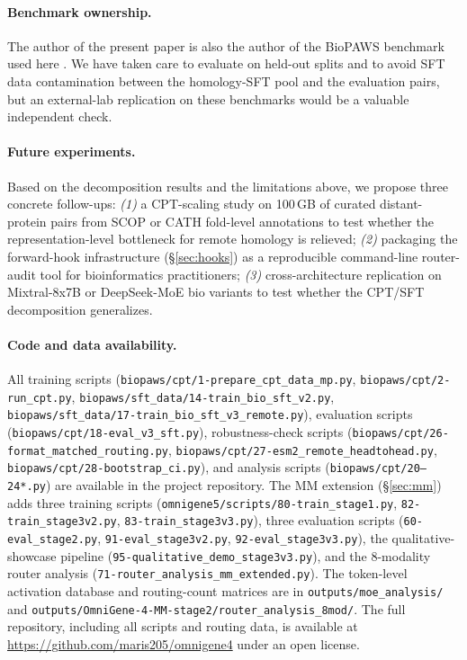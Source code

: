 \documentclass[11pt]{article}
\begin{document}
\paragraph{Benchmark ownership.} The author of the present paper is also the author of the BioPAWS benchmark used here \citep{wang2026biopaws}. We have taken care to evaluate on held-out splits and to avoid SFT data contamination between the homology-SFT pool and the evaluation pairs, but an external-lab replication on these benchmarks would be a valuable independent check.

\paragraph{Future experiments.}

Based on the decomposition results and the limitations above, we propose three concrete follow-ups: \emph{(1)} a CPT-scaling study on 100\,GB of curated distant-protein pairs from SCOP \citep{murzin1995scop} or CATH fold-level annotations to test whether the representation-level bottleneck for remote homology is relieved; \emph{(2)} packaging the forward-hook infrastructure (\S\ref{sec:hooks}) as a reproducible command-line router-audit tool for bioinformatics practitioners; \emph{(3)} cross-architecture replication on Mixtral-8x7B \citep{jiang2024mixtral} or DeepSeek-MoE \citep{dai2024deepseekmoe} bio variants to test whether the CPT/SFT decomposition generalizes.

\paragraph{Code and data availability.}

All training scripts (\texttt{biopaws/cpt/1-prepare\_cpt\_data\_mp.py}, \texttt{biopaws/cpt/2-run\_cpt.py}, \texttt{biopaws/sft\_data/14-train\_bio\_sft\_v2.py}, \texttt{biopaws/sft\_data/17-train\_bio\_sft\_v3\_remote.py}), evaluation scripts (\texttt{biopaws/cpt/18-eval\_v3\_sft.py}), robustness-check scripts (\texttt{biopaws/cpt/26-format\_matched\_routing.py}, \texttt{biopaws/cpt/27-esm2\_remote\_headtohead.py}, \texttt{biopaws/cpt/28-bootstrap\_ci.py}), and analysis scripts (\texttt{biopaws/cpt/20--24*.py}) are available in the project repository. The MM extension (\S\ref{sec:mm}) adds three training scripts (\texttt{omnigene5/scripts/80-train\_stage1.py}, \texttt{82-train\_stage3v2.py}, \texttt{83-train\_stage3v3.py}), three evaluation scripts (\texttt{60-eval\_stage2.py}, \texttt{91-eval\_stage3v2.py}, \texttt{92-eval\_stage3v3.py}), the qualitative-showcase pipeline (\texttt{95-qualitative\_demo\_stage3v3.py}), and the 8-modality router analysis (\texttt{71-router\_analysis\_mm\_extended.py}). The token-level activation database and routing-count matrices are in \texttt{outputs/moe\_analysis/} and \texttt{outputs/OmniGene-4-MM-stage2/router\_analysis\_8mod/}. The full repository, including all scripts and routing data, is available at \url{https://github.com/maris205/omnigene4} under an open license.
\end{document}
